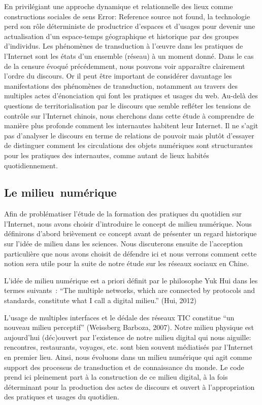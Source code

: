 En privilégiant une approche dynamique et relationnelle des lieux comme constructions sociales de sens Error: Reference source not found, la technologie perd son rôle déterministe de productrice d’espaces et d’usages pour devenir une actualisation d’un espace-temps géographique et historique par des groupes d’individus. Les phénomènes de transduction à l’œuvre dans les pratiques de l’Internet sont les états d’un ensemble (réseau) à un moment donné. Dans le cas de la censure évoqué précédemment, nous pouvons voir apparaître clairement l’ordre du discours. Or il peut être important de considérer davantage les manifestations des phénomènes de transduction, notamment au travers des multiples actes d’énonciation qui font les pratiques et usages du web. Au-delà des questions de territorialisation par le discours que semble refléter les tensions de contrôle sur l’Internet chinois, nous cherchons dans cette étude à comprendre de manière plus profonde comment les internautes habitent leur Internet. Il ne s’agit pas d’analyser le discours en terme de relations de pouvoir mais plutôt d’essayer de distinguer comment les circulations des objets numériques sont structurantes pour les pratiques des internautes, comme autant de lieux habités quotidiennement.

\subsection[Le milieu numérique]{Le milieu numérique}

Afin de problématiser l’étude de la formation des pratiques du quotidien sur l’Internet, nous avons choisir d’introduire le concept de milieu numérique. Nous définirons d’abord brièvement ce concept avant de présenter un regard historique sur l’idée de milieu dans les sciences. Nous discuterons ensuite de l’acception particulière que nous avons choisit de défendre ici et nous verrons comment cette notion sera utile pour la suite de notre étude sur les réseaux sociaux en Chine.

L’idée de milieu numérique est a priori définit par le philosophe Yuk Hui dans les termes suivants : 
“The multiple networks, which are connected by protocols and standards, constitute what I call a digital milieu.” (Hui, 2012)

L’usage de multiples interfaces et le dédale des réseaux TIC constitue “un nouveau milieu perceptif” (Weissberg  Barboza, 2007). Notre milieu physique est aujourd’hui (déc)ouvert par l’existence de notre milieu digital qui nous aiguille: rencontres, restaurants, voyages, etc. sont bien souvent médiatisés par l’Internet en premier lieu. Ainsi, nous évoluons dans un milieu numérique qui agit comme support des processus de transduction et de connaissance du monde. Le code prend ici pleinement part à la construction de ce milieu digital, à la fois déterminant pour la production des actes de discours et ouvert à l’appropriation des pratiques et usages du quotidien.

